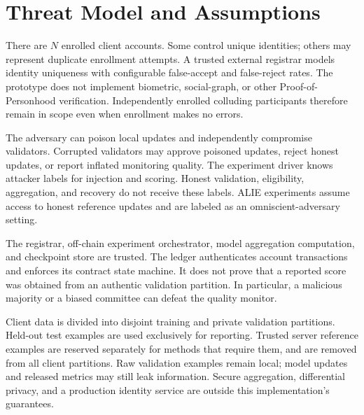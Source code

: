 \section{Threat Model and Assumptions}
\label{sec:threat}
There are $N$ enrolled client accounts. Some control unique identities; others
may represent duplicate enrollment attempts. A trusted external registrar models
identity uniqueness with configurable false-accept and false-reject rates.
The prototype does not implement biometric, social-graph, or other
Proof-of-Personhood verification. Independently enrolled colluding participants
therefore remain in scope even when enrollment makes no errors.

The adversary can poison local updates and independently compromise validators.
Corrupted validators may approve poisoned updates, reject honest updates, or
report inflated monitoring quality. The experiment driver knows attacker labels
for injection and scoring. Honest validation, eligibility, aggregation, and
recovery do not receive these labels. ALIE experiments assume access to honest
reference updates and are labeled as an omniscient-adversary setting.

The registrar, off-chain experiment orchestrator, model aggregation computation,
and checkpoint store are trusted. The ledger authenticates account transactions
and enforces its contract state machine. It does not prove that a reported score
was obtained from an authentic validation partition. In particular, a malicious
majority or a biased committee can defeat the quality monitor.

Client data is divided into disjoint training and private validation partitions.
Held-out test examples are used exclusively for reporting. Trusted server
reference examples are reserved separately for methods that require them, and
are removed from all client partitions. Raw validation examples remain local;
model updates and released metrics may still leak information. Secure aggregation,
differential privacy, and a production identity service are outside this
implementation's guarantees.
